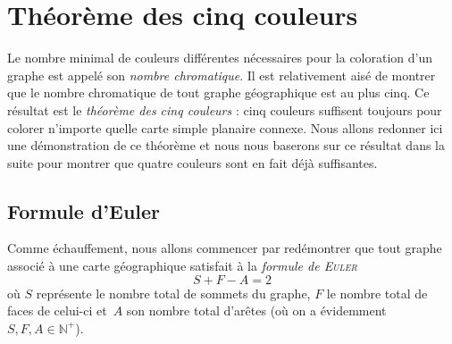 \chapter{Théorème des cinq couleurs}

Le nombre minimal de couleurs différentes nécessaires pour la coloration d'un graphe est appelé son \textit{nombre chromatique}. Il est relativement aisé de montrer que le nombre chromatique de tout graphe géographique est au plus cinq. Ce résultat est le \textit{théorème des cinq couleurs} : cinq couleurs suffisent toujours pour colorer n'importe quelle carte simple planaire connexe. Nous allons redonner ici une démonstration de ce théorème et nous nous baserons sur ce résultat dans la suite pour montrer que quatre couleurs sont en fait déjà suffisantes.

\section{Formule d'Euler}

Comme échauffement, nous allons commencer par redémontrer que tout graphe associé à une carte géographique satisfait à la \textit{formule de \textsc{Euler}} $$S+F-A=2$$ où $S$ représente le nombre total de sommets du graphe, $F$ le nombre total de faces de celui-ci et~$A$ son nombre total d'arêtes (où on a évidemment $S, F, A \in\mathbb{N}^+$).\smallskip

\begin{figure}[b!]
\end{figure}


